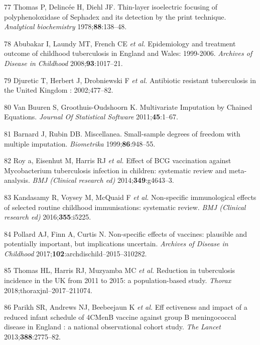 \documentclass[11pt,twoside]{bristolthesis}
\begin{document}
  \leavevmode\hypertarget{ref-DCLG2011}{}%
  77 Thomas P, Delincée H, Diehl JF. Thin-layer isoelectric focusing of polyphenoloxidase of Sephadex and its detection by the print technique. \emph{Analytical biochemistry} 1978;\textbf{88}:138--48.
  
  \leavevmode\hypertarget{ref-Abubakar2008}{}%
  78 Abubakar I, Laundy MT, French CE \emph{et al.} Epidemiology and treatment outcome of childhood tuberculosis in England and Wales: 1999-2006. \emph{Archives of Disease in Childhood} 2008;\textbf{93}:1017--21.
  
  \leavevmode\hypertarget{ref-Djuretic2002}{}%
  79 Djuretic T, Herbert J, Drobniewski F \emph{et al.} Antibiotic resistant tuberculosis in the United Kingdom : 2002;477--82.
  
  \leavevmode\hypertarget{ref-VanBuuren2011}{}%
  80 Van Buuren S, Groothuis-Oudshoorn K. Multivariate Imputation by Chained Equations. \emph{Journal Of Statistical Software} 2011;\textbf{45}:1--67.
  
  \leavevmode\hypertarget{ref-Barnard1999}{}%
  81 Barnard J, Rubin DB. Miscellanea. Small-sample degrees of freedom with multiple imputation. \emph{Biometrika} 1999;\textbf{86}:948--55.
  
  \leavevmode\hypertarget{ref-Roy2014b}{}%
  82 Roy a, Eisenhut M, Harris RJ \emph{et al.} Effect of BCG vaccination against Mycobacterium tuberculosis infection in children: systematic review and meta-analysis. \emph{BMJ (Clinical research ed)} 2014;\textbf{349}:g4643--3.
  
  \leavevmode\hypertarget{ref-Kandasamy2016}{}%
  83 Kandasamy R, Voysey M, McQuaid F \emph{et al.} Non-specific immunological effects of selected routine childhood immunisations: systematic review. \emph{BMJ (Clinical research ed)} 2016;\textbf{355}:i5225.
  
  \leavevmode\hypertarget{ref-Pollard2017}{}%
  84 Pollard AJ, Finn A, Curtis N. Non-specific effects of vaccines: plausible and potentially important, but implications uncertain. \emph{Archives of Disease in Childhood} 2017;\textbf{102}:archdischild--2015--310282.
  
  \leavevmode\hypertarget{ref-Thomas2018}{}%
  85 Thomas HL, Harris RJ, Muzyamba MC \emph{et al.} Reduction in tuberculosis incidence in the UK from 2011 to 2015: a population-based study. \emph{Thorax} 2018;thoraxjnl--2017--211074.
  
  \leavevmode\hypertarget{ref-Parikh2016a}{}%
  86 Parikh SR, Andrews NJ, Beebeejaun K \emph{et al.} Eff ectiveness and impact of a reduced infant schedule of 4CMenB vaccine against group B meningococcal disease in England : a national observational cohort study. \emph{The Lancet} 2013;\textbf{388}:2775--82.
  
\end{document}
